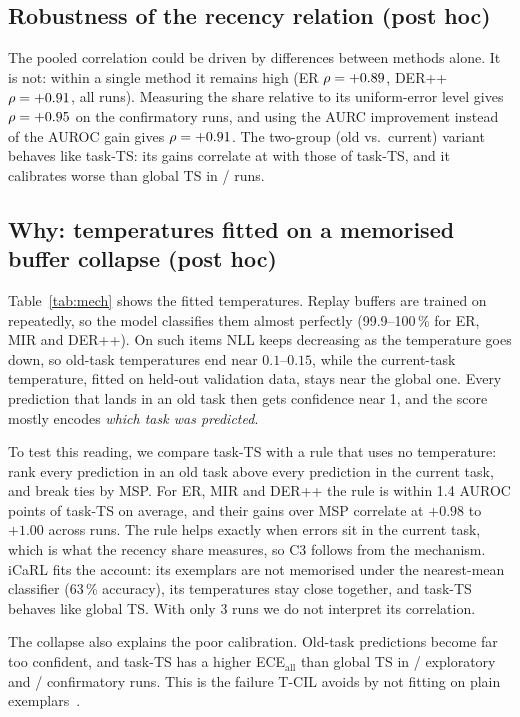 \documentclass[11pt]{article}
\newcommand{\taskts}{task-TS}
\begin{document}
\subsection{Robustness of the recency relation (post hoc)}\label{sec:robust}
The pooled correlation could be driven by differences between methods alone. It is not: within a
single method it remains high (ER $\rho=+0.89$, DER++ $\rho=+0.91$, all runs).
Measuring the share relative to its uniform-error level gives $\rho=+0.95$ on the
confirmatory runs, and using the AURC improvement instead of the AUROC gain gives
$\rho=+0.91$. The two-group (old vs.\ current) variant behaves like \taskts: its gains correlate
at \oldnewCorr{} with those of \taskts, and it calibrates worse than global TS in
\oldnewWorseTs/\nTotal{} runs.

\subsection{Why: temperatures fitted on a memorised buffer collapse (post hoc)}\label{sec:mech}
Table~\ref{tab:mech} shows the fitted temperatures. Replay buffers are trained on repeatedly, so
the model classifies them almost perfectly (99.9--100\,\% for ER, MIR and DER++). On such items NLL
keeps decreasing as the temperature goes down, so old-task temperatures end near $0.1$--$0.15$,
while the current-task temperature, fitted on held-out validation data, stays near the global one.
Every prediction that lands in an old task then gets confidence near 1, and the score mostly
encodes \emph{which task was predicted}.

To test this reading, we compare \taskts{} with a rule that uses no temperature: rank every
prediction in an old task above every prediction in the current task, and break ties by MSP. For
ER, MIR and DER++ the rule is within 1.4 AUROC points of \taskts{} on average, and their gains over
MSP correlate at $+0.98$ to $+1.00$ across runs. The rule helps exactly when errors sit in the
current task, which is what the recency share measures, so C3 follows from the mechanism. iCaRL
fits the account: its exemplars are not memorised under the nearest-mean classifier (63\,\%
accuracy), its temperatures stay close together, and \taskts{} behaves like global TS. With only
3 runs we do not interpret its correlation.

The collapse also explains the poor calibration. Old-task predictions become far too confident,
and \taskts{} has a higher ECE$_\mathrm{all}$ than global TS in \worseTsExplore/\nExplore{}
exploratory and \worseTsConfirm/\nConfirm{} confirmatory runs. This is the failure T-CIL avoids by
not fitting on plain exemplars~\cite{hwang2025tcil}.
\end{document}
